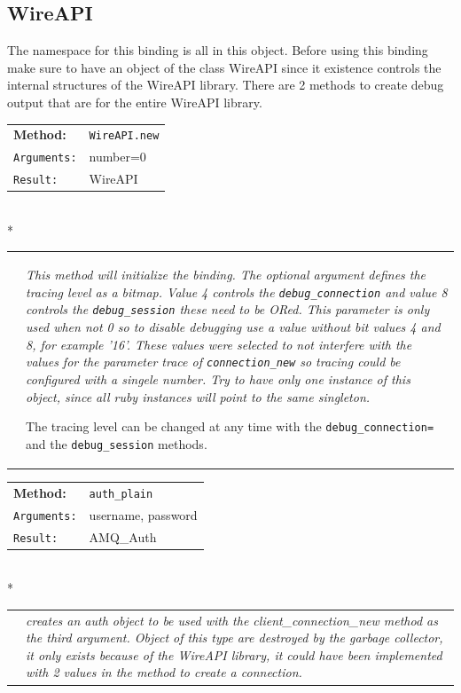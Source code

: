\documentclass[a4paper,twoside]{article}
\newcommand{\method}[4]{
\noindent
 \index{#1}
 \begin{tabular}{ll}
   {\bf {\small Method:}} & {\large {\tt #1}} \\    
   {\tt {\small Arguments:}} & {\rm #2} \\ 
   {\tt {\small Result:}}    & {\rm #3}
 \end{tabular}
 \\*
 \begin{tabular}{ll}
   \hspace{1mm}&
   \begin{minipage}[l]{0.8\textwidth}
     {\sl #4} 
   \end{minipage}
 \end{tabular}
\vspace{0.5cm}
}
\begin{document}
\subsection{WireAPI}

The namespace for this binding is all in this object. Before
using this binding make sure to have an object of the class
WireAPI since it existence controls the internal structures
of the WireAPI library. There are 2 methods to create debug
output that are for the entire WireAPI library.

\method{WireAPI.new}{number=0}{WireAPI}
       {
         This method will initialize the binding. The optional 
         argument defines the tracing level as a bitmap. Value
         4 controls the {\tt debug\_connection} and value 8 
         controls the {\tt debug\_session} these need to be ORed.      
         This parameter is only used when not 0 so to disable
         debugging use a value without bit values  4 and 8,
         for example '16'. These values were selected to not
         interfere with the values for the parameter trace
         of {\tt connection\_new} so tracing could be configured
         with a singele number.
         Try to have only one instance of this object, since all 
         ruby instances will point to the same singleton.         

         The tracing level can be changed at any time with the 
         {\tt debug\_connection=} and the {\tt debug\_session}
         methods.
       }


\method{auth\_plain}{username, password}{AMQ\_Auth}
       {
         creates an auth object to be used with the 
         client\_connection\_new method as the third argument. 
         Object of this type are destroyed by the garbage collector,
         it only exists because of the WireAPI library, it could
         have been implemented with 2 values in the method
         to create a connection.
       }
\end{document}
